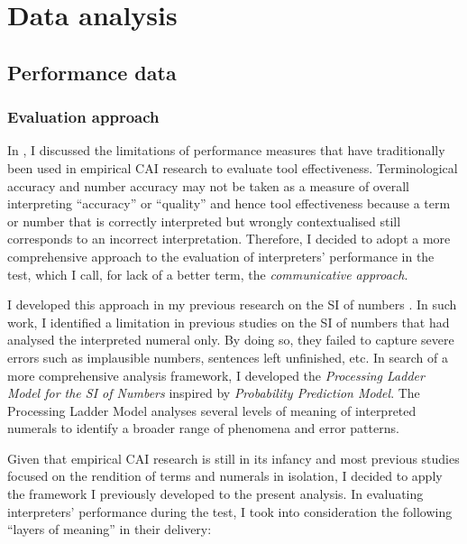 \section{Data analysis}\label{sec:data_analysis}


\subsection{Performance data}

\subsubsection{Evaluation approach}

In , I discussed the limitations of performance measures that have traditionally been used in empirical CAI research to evaluate tool effectiveness. Terminological accuracy and number accuracy may not be taken as a measure of overall interpreting ``accuracy'' or ``quality'' and hence tool effectiveness because a term or number that is correctly interpreted but wrongly contextualised still corresponds to an incorrect interpretation. Therefore, I decided to adopt a more comprehensive approach to the evaluation of interpreters’ performance in the test, which I call, for lack of a better term, the \textit{communicative approach}.

I developed this approach in my previous research on the SI of numbers \citep{frittella2017numeri,frittella2019a}. In such work, I identified a limitation in previous studies on the SI of numbers that had analysed the interpreted numeral only. By doing so, they failed to capture severe errors such as implausible numbers, sentences left unfinished, etc. In search of a more comprehensive analysis framework, I developed the \textit{Processing Ladder Model for the SI of Numbers} \citep{frittella2017numeri,frittella2019a} inspired by \citet{chernov2004inference} \textit{Probability Prediction Model}. The Processing Ladder Model analyses several levels of meaning of interpreted numerals to identify a broader range of phenomena and error patterns.

Given that empirical CAI research is still in its infancy and most previous studies focused on the rendition of terms and numerals in isolation, I decided to apply the framework I previously developed to the present analysis. In evaluating interpreters’ performance during the test, I took into consideration the following ``layers of meaning'' in their delivery:

